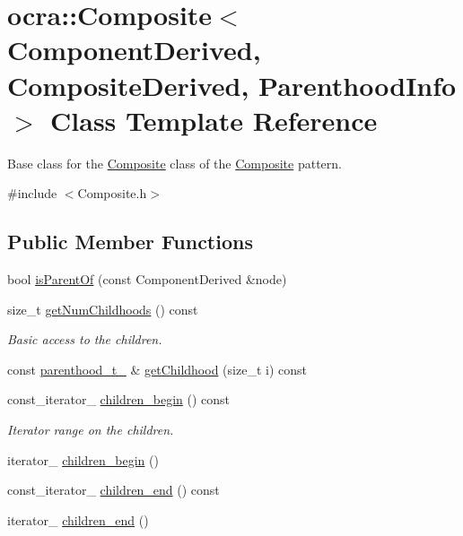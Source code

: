 \hypertarget{classocra_1_1Composite}{}\section{ocra\+:\+:Composite$<$ Component\+Derived, Composite\+Derived, Parenthood\+Info $>$ Class Template Reference}
\label{classocra_1_1Composite}


Base class for the \hyperlink{classocra_1_1Composite}{Composite} class of the \hyperlink{classocra_1_1Composite}{Composite} pattern.  




{\ttfamily \#include $<$Composite.\+h$>$}

\subsection*{Public Member Functions}
\begin{DoxyCompactItemize}
\item 
bool \hyperlink{classocra_1_1Composite_a7d241ce8b7c6410c021a9314773fe7d3}{is\+Parent\+Of} (const Component\+Derived \&node)
\end{DoxyCompactItemize}
{\bf }\par
\begin{DoxyCompactItemize}
\item 
size\+\_\+t \hyperlink{classocra_1_1Composite_a6e086100cb4b206e9f398b90c39afa85}{get\+Num\+Childhoods} () const
\begin{DoxyCompactList}\small\item\em Basic access to the children. \end{DoxyCompactList}\item 
const \hyperlink{classocra_1_1Parenthood}{parenthood\+\_\+t\+\_\+} \& \hyperlink{classocra_1_1Composite_a89f12c8168afbe1da62b4c660e234c79}{get\+Childhood} (size\+\_\+t i) const
\end{DoxyCompactItemize}

{\bf }\par
\begin{DoxyCompactItemize}
\item 
const\+\_\+iterator\+\_\+ \hyperlink{classocra_1_1Composite_aa1e83d4f1a905bfdebfc9c670c1e819a}{children\+\_\+begin} () const
\begin{DoxyCompactList}\small\item\em Iterator range on the children. \end{DoxyCompactList}\item 
iterator\+\_\+ \hyperlink{classocra_1_1Composite_ab5ec766141bb1d85ad8c32fdafe5e041}{children\+\_\+begin} ()
\item 
const\+\_\+iterator\+\_\+ \hyperlink{classocra_1_1Composite_a1930b259df137386b64cd84e96b4d30e}{children\+\_\+end} () const
\item 
iterator\+\_\+ \hyperlink{classocra_1_1Composite_aea1639d5f852f80eb12266dcbb730a3b}{children\+\_\+end} ()
\end{DoxyCompactItemize}

